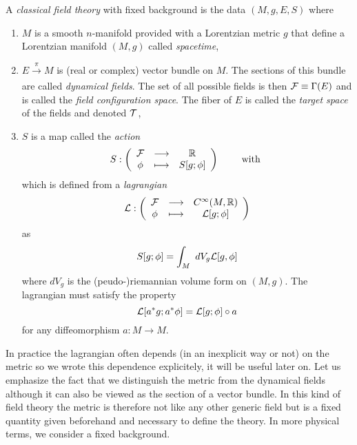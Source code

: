 \documentclass[a4paper,10pt]{article}
\begin{document}
    A \emph{classical field theory} with fixed background is the data $(M,g,E,S)$ where
    \begin{enumerate}
        \item $M$ is a smooth $n$-manifold provided with a Lorentzian metric $g$ that define a Lorentzian manifold $(M,g)$ called \emph{spacetime},
        \item $E\xrightarrow[]{\pi}M$ is (real or complex) vector bundle on $M$. The sections of this bundle are called \emph{dynamical fields}. The set of all possible fields is then $\mathcal{F}\equiv\Gamma(E)$ and is called the \emph{field configuration space}. The fiber of $E$ is called the \emph{target space} of the fields and denoted $\mathcal{T}$,
        \item $S$ is a map called the \emph{action} 
        \begin{equation}
            S:\left(
            \begin{array}{ccc}
                \mathcal{F} & \longrightarrow & \mathbb{R} \\
                \phi & \longmapsto & S[g;\phi]
            \end{array}
            \right)\qquad\text{ with }
        \end{equation}
        which is defined from a \emph{lagrangian}
        \begin{equation}
            \mathcal{L}:\left(
            \begin{array}{ccc}
                \mathcal{F} & \longrightarrow & C^\infty(M,\mathbb{R}) \\
                \phi & \longmapsto & \mathcal{L}[g;\phi]
            \end{array}
            \right)
        \end{equation}
        as
        \begin{equation}
            S[g;\phi]=\int_M~dV_g\mathcal{L}[g,\phi]
        \end{equation}
        where $dV_g$ is the (peudo-)riemannian volume form on $(M,g)$. The lagrangian must satisfy the property
        \begin{equation}
            \mathcal{L}[a^*g;a^*\phi]=\mathcal{L}[g;\phi]\circ a\label{eq:lagcdt}
        \end{equation}
        for any diffeomorphism $a:M\to M$.
    \end{enumerate}
    In practice the lagrangian often depends (in an inexplicit way or not) on the metric so we wrote this dependence explicitely, it will be useful later on. Let us emphasize the fact that we distinguish the metric from the dynamical fields although it can also be viewed as the section of a vector bundle. In this kind of field theory the metric is therefore not like any other generic field but is a fixed quantity given beforehand and necessary to define the theory. In more physical terms, we consider a fixed background.
\end{document}

